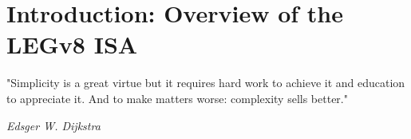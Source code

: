 \chapter{Introduction: \newline Overview of the LEGv8 ISA}
\epigraph{"Simplicity is a great virtue but it requires hard work to achieve it and education to appreciate it. And to make matters worse: complexity sells better."}{\textit{Edsger W. Dijkstra}}
\lipsum